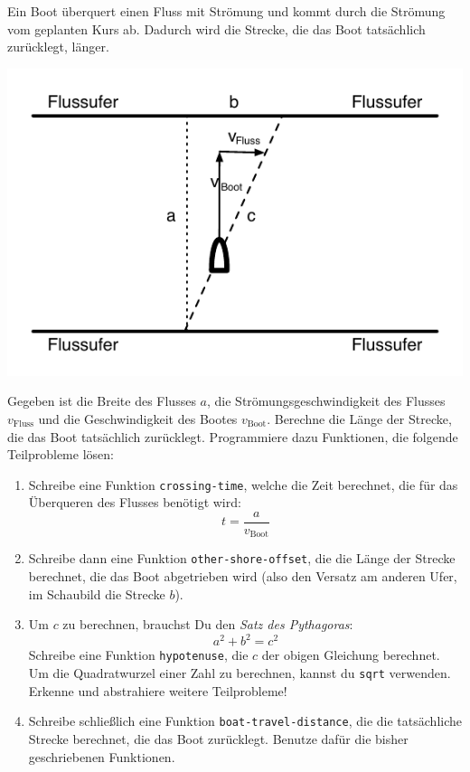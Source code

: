 \begin{aufgabe}

 Ein Boot überquert einen Fluss mit Strömung und
  kommt durch die Strömung vom geplanten Kurs ab.  Dadurch wird die
  Strecke, die das Boot tatsächlich zurücklegt, länger.

  \begin{center}
    \includegraphics{riverboat}
  \end{center}

  Gegeben ist die Breite des Flusses $a$, die Strömungsgeschwindigkeit
  des Flusses $v_{\text{Fluss}}$ und die Geschwindigkeit des Bootes
  $v_{\text{Boot}}$.  Berechne die Länge der Strecke, die das
  Boot tatsächlich zurücklegt.  Programmiere dazu Funktionen, die
  folgende Teilprobleme lösen:

  \begin{enumerate}
  \item Schreibe eine Funktion \lstinline{crossing-time}, welche die
    Zeit berechnet, die für das Überqueren des Flusses benötigt wird:
    \[t = \frac{a}{v_{\text{Boot}}}\]
  \item Schreibe dann eine Funktion \lstinline{other-shore-offset},
    die die Länge der Strecke berechnet, die das Boot abgetrieben wird
    (also den Versatz am anderen Ufer, im Schaubild die Strecke $b$).

  \item Um $c$ zu berechnen, brauchst Du den \textit{Satz des
      Pythagoras}:
    \begin{displaymath}
      a^2 + b^2 = c^2
    \end{displaymath}
    Schreibe eine Funktion \texttt{hypotenuse},
    die $c$ der obigen Gleichung berechnet.
    Um die Quadratwurzel einer Zahl zu berechnen,
    kannst du \texttt{sqrt} verwenden.
    Erkenne und abstrahiere weitere Teilprobleme!

  \item Schreibe schließlich eine Funktion
    \lstinline{boat-travel-distance}, die die tatsächliche Strecke
    berechnet, die das Boot zurücklegt.  Benutze dafür die bisher
    geschriebenen Funktionen.
  \end{enumerate}
\end{aufgabe}

